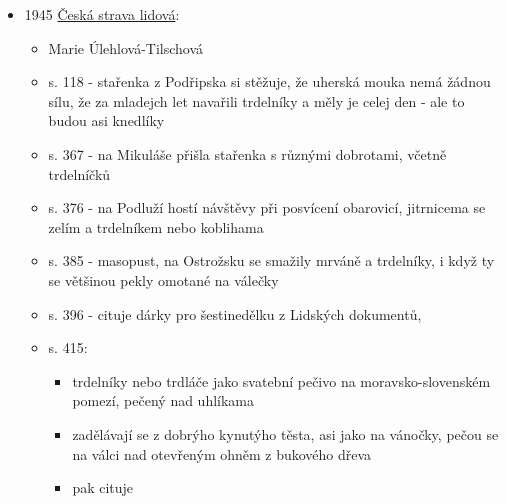 \begin{itemize}
  \begin{itemize}
  \tightlist
  \item
    roč. 3, č. 2-3, s. 18.
  \item
    \emph{Velikonoční poesie}, 
  \item
    s. 18:

    \begin{itemize}
    \tightlist
    \item
      Každá dědina má nějaké mistry. A má-li ona dědina svoji tetičku
      Niklíčku, která vyniká mistrným pečením trdelníků na křtiny a na
      úvody, a má-li jiná dědina svého Pavla Hůru, jenž dovede svým
      originálním způsobem
    \end{itemize}
  \end{itemize}
\item
  1945
  \href{https://ceskadigitalniknihovna.cz/view/uuid:89562bf0-7962-11e5-9690-005056827e51?page=uuid\%3A521d38f0-92de-11e5-bf6c-005056825209&fulltext=trdeln\%C3\%ADk\%20OR\%20trdeln\%C3\%ADky\%20OR\%20trdeln\%C3\%ADk\%C5\%AF&source=mzk}{Česká
  strava lidová}:

  \begin{itemize}
  \tightlist
  \item
    Marie Úlehlová-Tilschová
  \item
    s. 118 - stařenka z Podřipska si stěžuje, že uherská mouka nemá
    žádnou sílu, že za mladejch let navařili trdelníky a měly je celej
    den - ale to budou asi knedlíky
  \item
    s. 367 - na Mikuláše přišla stařenka s různými dobrotami, včetně
    trdelníčků
  \item
    s. 376 - na Podluží hostí návštěvy při posvícení obarovicí,
    jitrnicema se zelím a trdelníkem nebo koblihama
  \item
    s. 385 - masopust, na Ostrožsku se smažily mrváně a trdelníky, i
    když ty se většinou pekly omotané na válečky
  \item
    s. 396 - cituje dárky pro šestinedělku z Lidských dokumentů,
  \item
    s. 415:

    \begin{itemize}
    \tightlist
    \item
      trdelníky nebo trdláče jako svatební pečivo na moravsko-slovenském
      pomezí, pečený nad uhlíkama
    \item
      zadělávají se z dobrýho kynutýho těsta, asi jako na vánočky, pečou
      se na válci nad otevřeným ohněm z bukového dřeva
    \item
      pak cituje 


\end{itemize}
\end{itemize}
\end{itemize}
